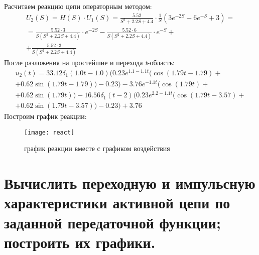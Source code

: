 \documentclass[a4paper,14pt ]{article} %
\begin{document}
    Расчитаем реакцию цепи операторным методом:
    \begin{multline}
        U_2(S) = H(S)\cdot U_1(S) =  \frac{5.52}{S^2 + 2.2S+ 4.4}
        \cdot \frac{1}{S}\left(3e^{-2S} - 6e^{-S} + 3\right) = \\
        = \frac{5.52\cdot3}{S(S^2 + 2.2S+ 4.4)}\cdot e^{-2S} -
        \frac{5.52\cdot6}{S(S^2 + 2.2S+ 4.4)}\cdot e^{-S} + \\
        + \frac{5.52\cdot3}{S(S^2 + 2.2S+ 4.4)}
    \end{multline}
    После разложения на простейшие и перехода {\it t}-область:
    \begin{multline}
        u_2(t) = 33.12\delta_1(1.0t - 1.0)
        (0.23e^{1.1 - 1.1t}(\cos(1.79t - 1.79) + \\
        + 0.62\sin(1.79t - 1.79)) - 0.23) - 
        3.76e^{-1.1t}(\cos(1.79t) + \\
        + 0.62\sin(1.79t)) - 16.56\delta_1(t - 2)(0.23e^{2.2 - 1.1t}
        (\cos(1.79t - 3.57) + \\
        + 0.62\sin(1.79t - 3.57)) - 
        0.23) + 3.76
    \end{multline}
    Построим график реакции:
    \begin{figure}[H]
        \texttt{[image: react]}
        \centering
        \caption{график реакции вместе с графиком воздействия}
    \end{figure}
    \section{Вычислить переходную и 
    импульсную характеристики активной цепи по
     заданной передаточной функции; построить их графики.}
     
\end{document}
